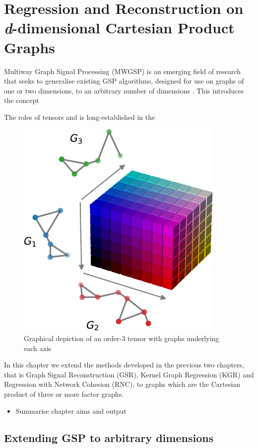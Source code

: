 

\chapter{Regression and Reconstruction on \textit{d}-dimensional Cartesian Product Graphs}


\label{chap:nd_gsp}

Multiway Graph Signal Processing (MWGSP) is an emerging field of research that seeks to generalise existing GSP algorithms, designed for use on graphs of one or two dimensions, to an arbitrary number of dimensions \citep{Stanley2020}. This introduces the concept 

The roles of tensors and is long-established in the 

\begin{figure}[t]
    \begin{center}
        \includegraphics[width=0.4\linewidth]{Figures/coloured_tensor.pdf}
    \end{center}
    \caption[Graphical depiction of an order-3 tensor]{Graphical depiction of an order-3 tensor with graphs underlying each axis}
    \label{fig:3D_colored_tensor}
\end{figure}


In this chapter we extend the methods developed in the previous two chapters, that is Graph Signal Reconstruction (GSR), Kernel Graph Regression (KGR) and Regression with Network Cohesion (RNC), to graphs which are the Cartesian product of three or more factor graphs. 

\begin{itemize}
    \item Summarise chapter aims and output
\end{itemize}




\section{Extending GSP to arbitrary dimensions}

